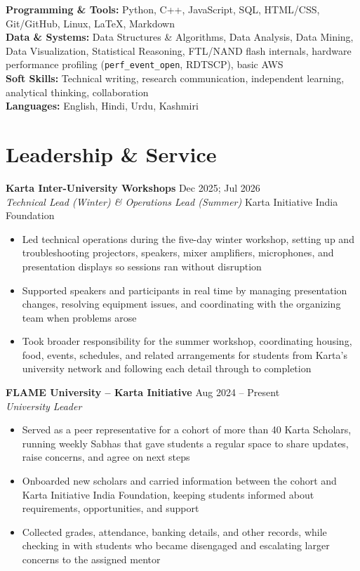 \documentclass[10pt,a4paper]{article}
\newcommand{\experience}[4]{
    \textbf{#1} \hfill #2\\
    \textit{#3} \hfill #4\\[0.1em]
}
\begin{document}
\textbf{Programming \& Tools:} Python, C++, JavaScript, SQL, HTML/CSS, Git/GitHub, Linux, LaTeX, Markdown\\
\textbf{Data \& Systems:} Data Structures \& Algorithms, Data Analysis, Data Mining, Data Visualization, Statistical Reasoning, FTL/NAND flash internals, hardware performance profiling (\texttt{perf\_event\_open}, RDTSCP), basic AWS\\
\textbf{Soft Skills:} Technical writing, research communication, independent learning, analytical thinking, collaboration\\
\textbf{Languages:} English, Hindi, Urdu, Kashmiri

\section*{Leadership \& Service}

\experience{Karta Inter-University Workshops}{Dec 2025; Jul 2026}{Technical Lead (Winter) \& Operations Lead (Summer)}{Karta Initiative India Foundation}
\begin{itemize}[leftmargin=*, itemsep=0pt, parsep=0pt, topsep=1pt]
    \item Led technical operations during the five-day winter workshop, setting up and troubleshooting projectors, speakers, mixer amplifiers, microphones, and presentation displays so sessions ran without disruption
    \item Supported speakers and participants in real time by managing presentation changes, resolving equipment issues, and coordinating with the organizing team when problems arose
    \item Took broader responsibility for the summer workshop, coordinating housing, food, events, schedules, and related arrangements for students from Karta's university network and following each detail through to completion
\end{itemize}

\experience{FLAME University -- Karta Initiative}{Aug 2024 -- Present}{University Leader}{}
\begin{itemize}[leftmargin=*, itemsep=0pt, parsep=0pt, topsep=1pt]
    \item Served as a peer representative for a cohort of more than 40 Karta Scholars, running weekly Sabhas that gave students a regular space to share updates, raise concerns, and agree on next steps
    \item Onboarded new scholars and carried information between the cohort and Karta Initiative India Foundation, keeping students informed about requirements, opportunities, and support
    \item Collected grades, attendance, banking details, and other records, while checking in with students who became disengaged and escalating larger concerns to the assigned mentor
\end{itemize}
\end{document}
